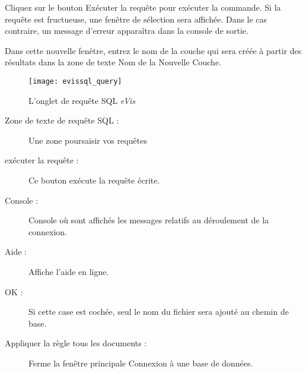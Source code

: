 
Cliquez sur le bouton Exécuter la requête pour exécuter la commande. Si la requête est fructueuse, une fenêtre de sélection sera affichée. Dans le cas contraire, un message d'erreur apparaîtra dans la console de sortie.


Dans cette nouvelle fenêtre, entrez le nom de la couche qui sera créée à partir des résultats dans la zone de texte Nom de la Nouvelle Couche.

\begin{figure}[ht]
   \begin{center}
\texttt{[image: evissql\_query]}
\caption{L'onglet de requête SQL \emph{eVis} \nixcaption}\label{evissql_query}
\end{center}
\end{figure}

\begin{description}
\item[Zone de texte de requête SQL :] Une zone poursaisir vos requêtes
\item[exécuter la requête :] Ce bouton exécute la requête écrite.
\item[Console :] Console où sont affichés les messages relatifs au déroulement de la connexion.
\item[Aide :] Affiche l'aide en ligne.
\item[OK :] Si cette case est cochée, seul le nom du fichier sera ajouté au chemin de base.
\item[Appliquer la règle tous les documents :] Ferme la fenêtre principale \og Connexion à une base de données\fg .
\end{description}

